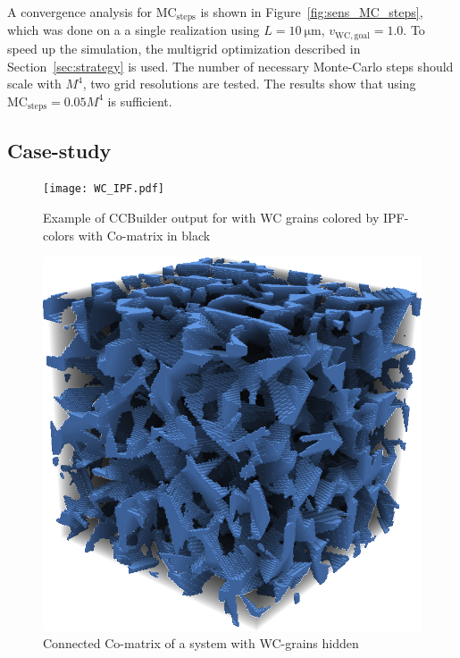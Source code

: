\documentclass[3p,12pt]{elsarticle}
\newcommand{\WC}{\mathrm{WC}}
\begin{document}
A convergence analysis for $\text{MC}_\text{steps}$ is shown in Figure~\ref{fig:sens_MC_steps}, which was done on a a single realization using $L = \SI{10}{\micro\meter}$, $v_{\WC,\text{goal}} = 1.0$.
To speed up the simulation, the multigrid optimization described in Section~\ref{sec:strategy} is used.
The number of necessary Monte-Carlo steps should scale with $M^4$, two grid resolutions are tested.
%
%
The results show that using $\text{MC}_\text{steps} = 0.05 M^4$ is sufficient.



\subsection{Case-study}


\begin{figure}[htbp!]
 \centering
 \texttt{[image: WC\_IPF.pdf]}
 \caption{Example of CCBuilder output for with WC grains colored by IPF-colors with Co-matrix in black} \label{fig:final_example}
\end{figure}

\begin{figure}[htbp!]
 \centering
 \includegraphics[width=0.5\linewidth]{co_matrix}
 \caption{Connected Co-matrix of a system with WC-grains hidden} \label{fig:final_example_co}
\end{figure}


% 
\end{document}
